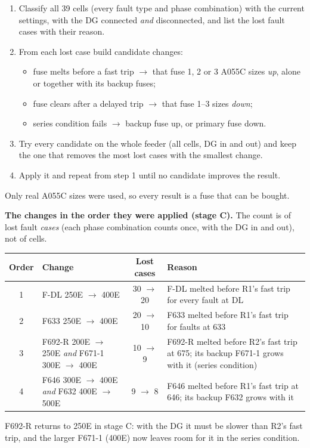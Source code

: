 \documentclass[11pt,a4paper]{article}
\newcommand{\sect}[1]{\bigskip{\Large\color{navy}\bfseries #1}\par\smallskip{\color{navy}\hrule height 0.8pt}\smallskip}
\begin{document}
\sect{4. How --- the procedure}
\begin{enumerate}[leftmargin=*,itemsep=3pt]
\item Classify all 39 cells (every fault type and phase combination) with the current settings, with the DG
  connected \emph{and} disconnected, and list the lost fault cases with their reason.
\item From each lost case build candidate changes:
  \begin{itemize}[itemsep=1pt]
  \item fuse melts before a fast trip $\rightarrow$ that fuse 1, 2 or 3 A055C sizes \emph{up}, alone or together
    with its backup fuses;
  \item fuse clears after a delayed trip $\rightarrow$ that fuse 1--3 sizes \emph{down};
  \item series condition fails $\rightarrow$ backup fuse up, or primary fuse down.
  \end{itemize}
\item Try every candidate on the whole feeder (all cells, DG in and out) and keep the one that removes the most
  lost cases with the smallest change.
\item Apply it and repeat from step 1 until no candidate improves the result.
\end{enumerate}
Only real A055C sizes were used, so every result is a fuse that can be bought.

\textbf{The changes in the order they were applied (stage C).} The count is of lost fault \emph{cases} (each phase
combination counts once, with the DG in and out), not of cells.

\begin{center}
\begin{tabular}{|c|>{\raggedright}p{4.3cm}|c|>{\raggedright\arraybackslash}p{7.0cm}|}
\hline
\textbf{Order} & \textbf{Change} & \textbf{Lost cases} & \textbf{Reason} \\ \hline
1 & F-DL 250E $\rightarrow$ 400E & 30 $\rightarrow$ 20 & F-DL melted before R1's fast trip for every fault at DL \\ \hline
2 & F633 250E $\rightarrow$ 400E & 20 $\rightarrow$ 10 & F633 melted before R1's fast trip for faults at 633 \\ \hline
3 & F692-R 200E $\rightarrow$ 250E \emph{and} F671-1 300E $\rightarrow$ 400E & 10 $\rightarrow$ 9 &
  F692-R melted before R2's fast trip at 675; its backup F671-1 grows with it (series condition) \\ \hline
4 & F646 300E $\rightarrow$ 400E \emph{and} F632 400E $\rightarrow$ 500E & 9 $\rightarrow$ 8 &
  F646 melted before R1's fast trip at 646; its backup F632 grows with it \\ \hline
\end{tabular}
\end{center}
F692-R returns to 250E in stage C: with the DG it must be slower than R2's fast trip, and the larger F671-1
(400E) now leaves room for it in the series condition.
\end{document}
